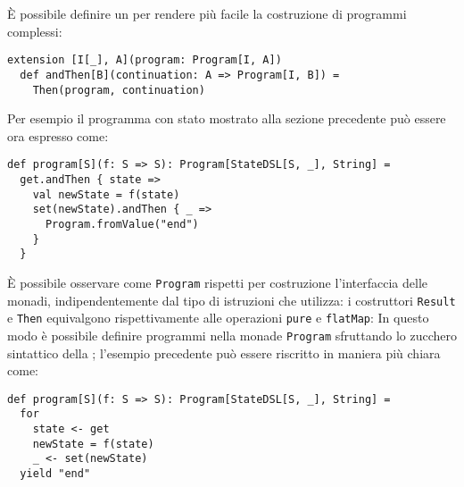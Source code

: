 È possibile definire un  per rendere più facile la costruzione di programmi complessi:
\begin{lstlisting}[language=scala3]
extension [I[_], A](program: Program[I, A])
  def andThen[B](continuation: A => Program[I, B]) =
    Then(program, continuation)
\end{lstlisting}

Per esempio il programma con stato mostrato alla sezione precedente può essere ora espresso come:
\begin{lstlisting}[language=scala3]
def program[S](f: S => S): Program[StateDSL[S, _], String] =
  get.andThen { state => 
    val newState = f(state)
    set(newState).andThen { _ => 
      Program.fromValue("end")
    }
  }
\end{lstlisting}

È possibile osservare come \lstinline{Program} rispetti per costruzione l'interfaccia delle monadi, indipendentemente dal tipo di istruzioni che utilizza: i costruttori \lstinline{Result} e \lstinline{Then} equivalgono rispettivamente alle operazioni \lstinline{pure} e \lstinline{flatMap}:
In questo modo è possibile definire programmi nella monade \lstinline{Program} sfruttando lo zucchero sintattico della ; l'esempio precedente può essere riscritto in maniera più chiara come:
\begin{lstlisting}[language=scala3]
def program[S](f: S => S): Program[StateDSL[S, _], String] =
  for
    state <- get
    newState = f(state)
    _ <- set(newState)
  yield "end"
\end{lstlisting}
